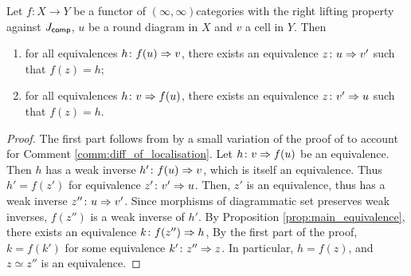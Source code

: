 \begin{lem} \label{lem:isofib_left_right_lift}
    Let \( f \colon X \to Y \) be a functor of \( (\infty, \infty) \)\nbd categories with the right lifting property against \( J_{\mathsf{comp}} \), \( u \) be a round diagram in \( X \) and \( v \) a cell in \( Y \).
    Then
    \begin{enumerate}
        \item for all equivalences \( h \colon f(u) \Rightarrow v \), there exists an equivalence \( z \colon u \Rightarrow v' \) such that \( f(z) = h \);
        \item for all equivalences \( h \colon v \Rightarrow f(u) \), there exists an equivalence \( z \colon v' \Rightarrow u \) such that \( f(z) = h \).  
    \end{enumerate}
\end{lem}
\begin{proof}
    The first part follows from by a small variation of the proof of \cite[Proposition 3.7]{chanavat2024model} to account for Comment \ref{comm:diff_of_localisation}.
    Let \( h \colon v \Rightarrow f(u) \) be an equivalence.
    Then \( h \) has a weak inverse \( h' \colon f(u) \Rightarrow v \), which is itself an equivalence.
    Thus \( h' = f(z') \) for equivalence \( z' \colon v' \Rightarrow u \).
    Then, \( z' \) is an equivalence, thus has a weak inverse \( z'' \colon u \Rightarrow v' \).
    Since morphisms of diagrammatic set preserves weak inverses, \( f(z'') \) is a weak inverse of \( h' \).
    By Proposition \ref{prop:main_equivalence}, there exists an equivalence \( k \colon f(z'') \Rightarrow h \), 
    By the first part of the proof, \( k = f(k') \) for some equivalence \( k' \colon z'' \Rightarrow z \).
    In particular, \( h = f(z) \), and \( z \simeq z'' \) is an equivalence.
\end{proof}


